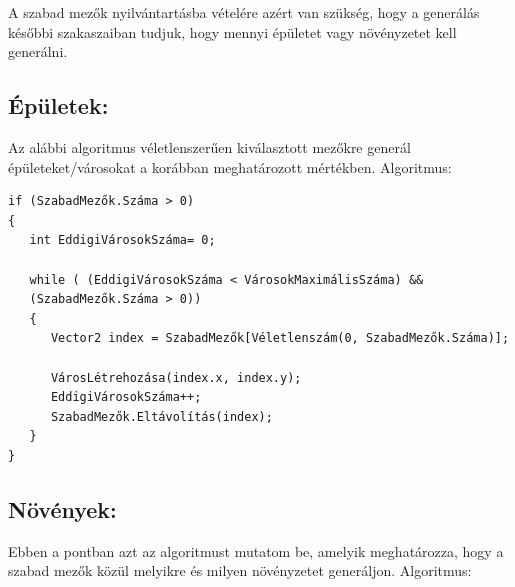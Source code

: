 \noindent A szabad mezők nyilvántartásba vételére azért van szükség, hogy a generálás későbbi szakaszaiban tudjuk, hogy mennyi épületet vagy növényzetet kell generálni.

\subsection{Épületek:}
Az alábbi algoritmus véletlenszerűen kiválasztott mezőkre generál épületeket/városokat a korábban meghatározott mértékben.
\newline
\newline Algoritmus:

\begin{verbatim}
if (SzabadMezők.Száma > 0)
{
   int EddigiVárosokSzáma= 0;
    
   while ( (EddigiVárosokSzáma < VárosokMaximálisSzáma) &&
   (SzabadMezők.Száma > 0))
   {
      Vector2 index = SzabadMezők[Véletlenszám(0, SzabadMezők.Száma)];

      VárosLétrehozása(index.x, index.y);
      EddigiVárosokSzáma++;
      SzabadMezők.Eltávolítás(index);
   }
}
\end{verbatim}

\subsection{Növények:}
Ebben a pontban azt az algoritmust mutatom be, amelyik meghatározza, hogy a szabad mezők közül melyikre és milyen növényzetet generáljon.
\newline
\newline Algoritmus:

